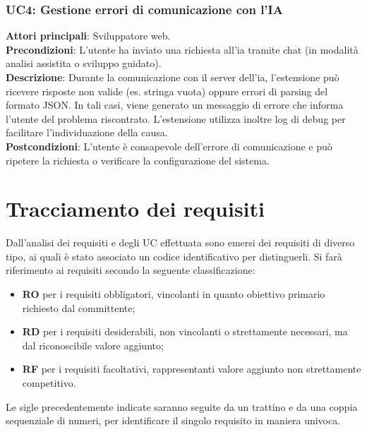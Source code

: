 \subsubsection*{UC4: Gestione errori di comunicazione con l’IA}
\noindent \textbf{Attori principali}: Sviluppatore web.\\
\textbf{Precondizioni}: L’utente ha inviato una richiesta all’\acrshort{ia} tramite chat (in modalità analisi assistita o sviluppo guidato).\\
\textbf{Descrizione}: Durante la comunicazione con il server dell’\acrshort{ia}, l’estensione può ricevere risposte non valide (es. stringa vuota) oppure errori di parsing del formato JSON. In tali casi, viene generato un messaggio di errore che informa l’utente del problema riscontrato. L’estensione utilizza inoltre log di debug per facilitare l’individuazione della causa.\\
\textbf{Postcondizioni}: L’utente è consapevole dell’errore di comunicazione e può ripetere la richiesta o verificare la configurazione del sistema.\\


\section{Tracciamento dei requisiti}
\label{sec:req}
\noindent Dall’analisi dei requisiti e degli UC effettuata sono emersi dei requisiti di diverso tipo, ai quali è stato associato un codice identificativo per distinguerli. Si farà riferimento ai requisiti secondo la seguente classificazione:
\begin{itemize}
    \item \textbf{RO} per i requisiti obbligatori, vincolanti in quanto obiettivo primario richiesto dal committente;
    \item \textbf{RD} per i requisiti desiderabili, non vincolanti o strettamente necessari, ma dal riconoscibile valore aggiunto;
    \item \textbf{RF} per i requisiti facoltativi, rappresentanti valore aggiunto non strettamente competitivo.
\end{itemize}

\noindent Le sigle precedentemente indicate saranno seguite da un trattino e da una coppia sequenziale di numeri, per identificare il singolo requisito in maniera univoca.

